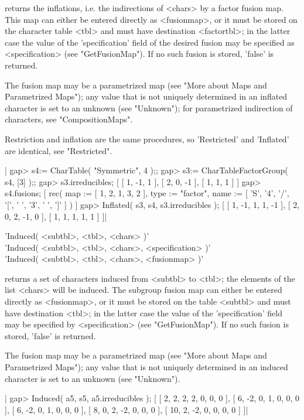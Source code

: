 returns the  inflations, i.e.  the indirections of  <chars> by  a  factor
fusion map.  This map can  either be entered  directly as <fusionmap>, or
it must be stored on the character table <tbl>  and must have destination
<factortbl>; in the latter case the value of the 'specification' field of
the  desired   fusion   may   be  specified  as    <specification>   (see
"GetFusionMap").  If no such fusion is stored, 'false' is returned.

The  fusion map  may be  a parametrized map   (see "More  about Maps  and
Parametrized Maps"); any  value that  is not  uniquely determined in   an
inflated character is set to an unknown (see "Unknown"); for parametrized
indirection of characters, see "CompositionMaps".

Restriction  and inflation are  the same procedures,  so 'Restricted' and
'Inflated' are identical, see "Restricted".

|    gap> s4:= CharTable( "Symmetric", 4 );;
    gap> s3:= CharTableFactorGroup( s4, [3] );;
    gap> s3.irreducibles;
    [ [ 1, -1, 1 ], [ 2, 0, -1 ], [ 1, 1, 1 ] ]
    gap> s4.fusions;
    [ rec(
          map := [ 1, 2, 1, 3, 2 ],
          type := "factor",
          name := [ 'S', '4', '/', '[', ' ', '3', ' ', ']' ] ) ]
    gap> Inflated( s3, s4, s3.irreducibles );
    [ [ 1, -1, 1, 1, -1 ], [ 2, 0, 2, -1, 0 ], [ 1, 1, 1, 1, 1 ] ]|

%

'Induced( <subtbl>, <tbl>, <chars> )'\\
'Induced( <subtbl>, <tbl>, <chars>, <specification> )'\\
'Induced( <subtbl>, <tbl>, <chars>, <fusionmap> )'

returns a set of characters induced from <subtbl>  to <tbl>; the elements
of the list <chars>  will be induced. The  subgroup fusion map can either
be entered directly as  <fusionmap>, or  it  must be stored on  the table
<subtbl> and must have destination <tbl>; in the latter case the value of
the  'specification'   field may be  specified    by <specification> (see
"GetFusionMap"). If no such fusion is stored, 'false' is returned.

The fusion  map  may be a   parametrized  map (see "More about   Maps and
Parametrized Maps");  any value  that is  not  uniquely determined  in an
induced character is set to an unknown (see "Unknown").

|    gap> Induced( a5, s5, a5.irreducibles );
    [ [ 2, 2, 2, 2, 0, 0, 0 ], [ 6, -2, 0, 1, 0, 0, 0 ],
      [ 6, -2, 0, 1, 0, 0, 0 ], [ 8, 0, 2, -2, 0, 0, 0 ],
      [ 10, 2, -2, 0, 0, 0, 0 ] ]|

